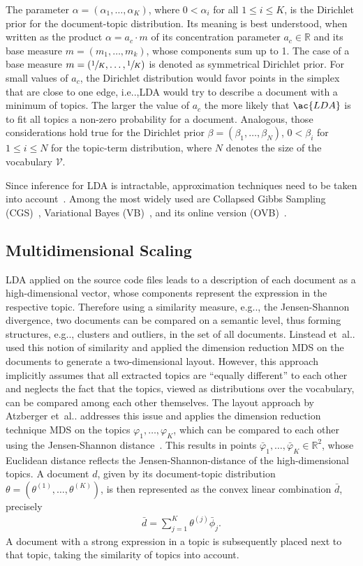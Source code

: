 \documentclass[runningheads]{llncs}
\makeatletter
\DeclareRobustCommand\onedot{\futurelet\@let@token\@onedot}
\def\@onedot{\ifx\@let@token.\else.\null\fi\xspace}
\def\etal{et~al\onedot}
\def\eg{e.g\onedot,\xspace}
\def\ie{i.e\onedot,\xspace}
\makeatother
\begin{document}
The parameter $\alpha = (\alpha_1, \dots, \alpha_K)$, where $0 < \alpha_i$ for all $1 \le i \le K$, is the Dirichlet prior for the document-topic distribution.
Its meaning is best understood, when written as the product $\alpha = a_c \cdot m$ of its concentration parameter $a_c \in \mathbb{R}$ and its base measure $m=(m_1, \dots, m_k)$, whose components sum up to 1.
The case of a base measure $m = (\sfrac{1}{K}, \dots, \sfrac{1}{K})$ is denoted as symmetrical Dirichlet prior.
For small values of $a_c$, the Dirichlet distribution would favor points in the simplex that are close to one edge, \ie \ac{LDA} would try to describe a document with a minimum of topics.
The larger the value of $a_c$ the more likely that $\ac{LDA}$ is to fit all topics a non-zero probability for a document.
Analogous, those considerations hold true for the Dirichlet prior $\beta = (\beta_1, \dots, \beta_N)$, $0 < \beta_i$ for $1\le i \le N$ for the topic-term distribution, where $N$ denotes the size of the vocabulary $\mathcal{V}$.

Since inference for \ac{LDA} is intractable, approximation techniques need to be taken into account~\cite{blei2003latent}.
Among the most widely used are Collapsed Gibbs Sampling (CGS)~\cite{Griffiths2004FindingTopics}, Variational Bayes (VB)~\cite{blei2003latent}, and its online version (OVB)~\cite{Hoffman2010OnlineLDA}.

\subsection{Multidimensional Scaling}
\ac{LDA} applied on the source code files leads to a description of each document as a high-dimensional vector, whose components represent the expression in the respective topic.
Therefore using a similarity measure, \eg the Jensen-Shannon divergence, two documents can be compared on a semantic level, thus forming structures, \eg clusters and outliers, in the set of all documents.
Linstead \etal used this notion of similarity and applied the dimension reduction \ac{MDS} on the documents to generate a two-dimensional layout.
However, this approach implicitly assumes that all extracted topics are \enquote{equally different} to each other and neglects the fact that the topics, viewed as distributions over the vocabulary, can be compared among each other themselves.
The layout approach by Atzberger \etal addresses this issue and applies the dimension reduction technique \ac{MDS} on the topics $\varphi_1, \dots, \varphi_K$, which can be compared to each other using the Jensen-Shannon distance~\cite{sievert2014ldavis,atzberger2021softwareforest}.
This results in points $\bar{\varphi}_1, \dots, \bar{\varphi}_K \in \mathbb{R}^2$, whose Euclidean distance reflects the Jensen-Shannon-distance of the high-dimensional topics.
A document $d$, given by its document-topic distribution $\theta = (\theta^{(1)}, \dots, \theta^{(K)})$, is then represented as the convex linear combination $\bar{d}$, precisely
\begin{align}
    \bar{d} = \sum \limits_{j=1}^{K} \theta^{(j)} \bar{\phi}_j.
\end{align}
A document with a strong expression in a topic is subsequently placed next to that topic, taking the similarity of topics into account.
\end{document}
